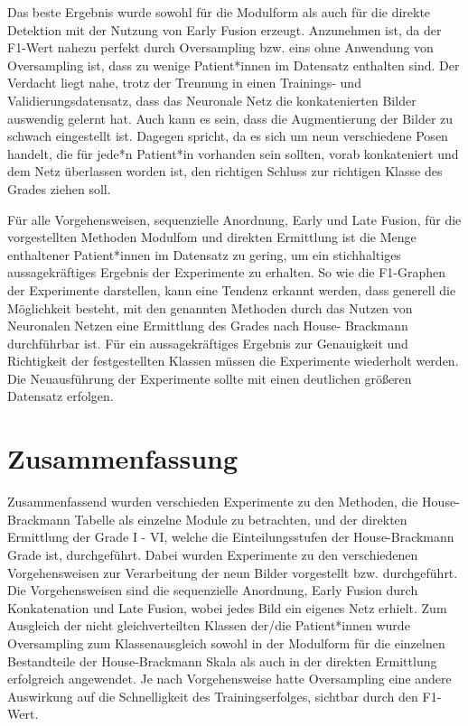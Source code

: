 Das beste Ergebnis wurde sowohl für die Modulform als auch für die direkte Detektion mit der Nutzung von Early Fusion erzeugt. Anzunehmen ist, da der F1-Wert nahezu perfekt durch Oversampling bzw. eins ohne Anwendung von Oversampling ist, dass zu wenige Patient*innen im Datensatz enthalten sind. Der Verdacht liegt nahe, trotz der Trennung in einen Trainings- und Validierungsdatensatz, dass das Neuronale Netz die konkatenierten Bilder auswendig gelernt hat. Auch kann es sein, dass die Augmentierung der Bilder zu schwach eingestellt ist. Dagegen spricht, da es sich um neun verschiedene Posen handelt, die für jede*n Patient*in vorhanden sein sollten, vorab konkateniert und dem Netz überlassen worden ist, den richtigen Schluss zur richtigen Klasse des Grades ziehen soll.

Für alle Vorgehensweisen, sequenzielle Anordnung, Early und Late Fusion, für die vorgestellten Methoden Modulfom und direkten Ermittlung ist die Menge enthaltener Patient*innen im Datensatz zu gering, um ein stichhaltiges aussagekräftiges Ergebnis der Experimente zu erhalten. So wie die F1-Graphen der Experimente darstellen, kann eine Tendenz erkannt werden, dass generell die Möglichkeit besteht, mit den genannten Methoden durch das Nutzen von Neuronalen Netzen eine Ermittlung des Grades nach House- Brackmann durchführbar ist. Für ein aussagekräftiges Ergebnis zur Genauigkeit und Richtigkeit der festgestellten Klassen müssen die Experimente wiederholt werden. Die Neuausführung der Experimente sollte mit einen deutlichen größeren Datensatz erfolgen.












\clearpage
\section{Zusammenfassung}\label{conclude}
Zusammenfassend wurden verschieden Experimente zu den Methoden, die House- Brackmann Tabelle als einzelne Module zu betrachten, und der direkten Ermittlung der Grade I - VI, welche die Einteilungsstufen der House-Brackmann Grade ist, durchgeführt. Dabei wurden Experimente zu den verschiedenen Vorgehensweisen zur Verarbeitung der neun Bilder vorgestellt bzw. durchgeführt. Die Vorgehensweisen sind die sequenzielle Anordnung, Early Fusion durch Konkatenation und Late Fusion, wobei jedes Bild ein eigenes Netz erhielt. Zum Ausgleich der nicht gleichverteilten Klassen der/die Patient*innen wurde Oversampling zum Klassenausgleich sowohl in der Modulform für die einzelnen Bestandteile der House-Brackmann Skala als auch in der direkten Ermittlung erfolgreich angewendet. Je nach Vorgehensweise hatte Oversampling eine andere Auswirkung auf die Schnelligkeit des Trainingserfolges, sichtbar durch den F1- Wert.

